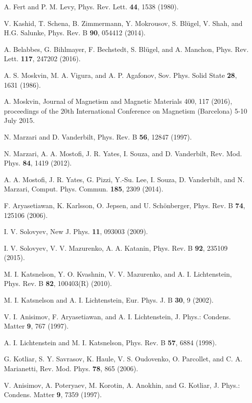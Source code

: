 \documentclass[aps,prl,twocolumn,showpacs,amsmath,amssymb]{revtex4-1}
\begin{document}
\begin{thebibliography}{199}
A. Fert and P. M. Levy, Phys. Rev. Lett. {\bf 44}, 1538 (1980).

V. Kashid, T. Schena, B. Zimmermann, Y. Mokrousov, S.
Bl\"ugel, V. Shah, and H.G. Salunke, Phys. Rev. B {\bf 90}, 054412 (2014).

A. Belabbes, G. Bihlmayer, F. Bechstedt, S. Bl\"ugel, and A. Manchon, Phys. Rev. Lett. {\bf 117}, 247202 (2016).

A. S. Moskvin, M. A. Vigura, and A. P. Agafonov, Sov.
Phys. Solid State {\bf 28}, 1631 (1986).

A. Moskvin, Journal of Magnetism and Magnetic Materials 400, 117 (2016), proceedings of the 20th International Conference on Magnetism (Barcelona) 5-10 July 2015.

N. Marzari and D. Vanderbilt, Phys. Rev. B
{\bf 56}, 12847 (1997).

N. Marzari, A. A. Mostofi, J. R. Yates, I. Souza, and D.
Vanderbilt, Rev. Mod. Phys. {\bf 84}, 1419 (2012).

A. A. Mostofi, J. R. Yates, G. Pizzi, Y.-Su. Lee, I. Souza, D. Vanderbilt, and N. Marzari, Comput. Phys. Commun. {\bf 185}, 2309 (2014).

F. Aryasetiawan, K. Karlsson, O. Jepsen, and U. Sch\"onberger, Phys. Rev. B {\bf 74}, 125106 (2006).

I. V. Solovyev, New J. Phys. {\bf 11}, 093003 (2009).

I. V. Solovyev, V. V. Mazurenko, A. A. Katanin, Phys. Rev. B {\bf 92}, 235109 (2015).

M. I. Katsnelson, Y. O. Kvashnin, V. V. Mazurenko, and A. I. Lichtenstein, Phys. Rev. B {\bf 82}, 100403(R) (2010).

M. I. Katsnelson and A. I. Lichtenstein, Eur. Phys. J. B {\bf 30}, 9
(2002).

V. I. Anisimov, F. Aryasetiawan, and A. I. Lichtenstein, J.
Phys.: Condens. Matter {\bf 9}, 767 (1997).

A. I. Lichtenstein and M. I. Katsnelson, Phys. Rev. B {\bf 57}, 6884
(1998).

G. Kotliar, S. Y. Savrasov, K. Haule, V. S. Oudovenko,
O. Parcollet, and C. A. Marianetti, Rev. Mod. Phys. {\bf 78}, 865
(2006).

V. Anisimov, A. Poteryaev, M. Korotin, A. Anokhin, and
G. Kotliar, J. Phys.: Condens. Matter {\bf 9}, 7359 (1997).


\end{thebibliography}
\end{document}

